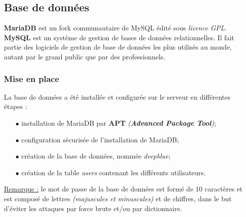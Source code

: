 \subsection{Base de données}
\label{subsec:bd}

\textbf{MariaDB} est un fork communautaire de MySQL édité sous \textit{licence
GPL}. \\

\textbf{MySQL} est un système de gestion de bases de données relationnelles. Il fait
partie des logiciels de gestion de base de données les plus utilisés au monde,
autant par le grand public que par des professionnels.


\subsubsection{Mise en place}
\label{subsubsec:mise-en-place}

La base de données a été installée et configurée sur le serveur en différentes
étapes :
\begin{itemize}

    \item[$\bullet$] installation de MariaDB par \textbf{APT}
    \textit{(\textbf{Advanced Package Tool})};
    \item[$\bullet$] configuration sécurisée de l'installation de MariaDB;
    \item[$\bullet$] création de la base de données, nommée \textit{deepblue};
    \item[$\bullet$] création de la table \og \textit{users} \fg contenant les
    différents utilisateurs. \\

\end{itemize}

\underline{Remarque :} le mot de passe de la base de données est formé de 10
caractères et est composé de lettres \textit{(majuscules et minuscules)} et de
chiffres, dans le but d'éviter les attaques par force brute et/ou par dictionnaire.


